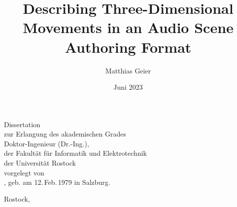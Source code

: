 \documentclass[
version=3.28,  %
a4paper,
11pt,
twoside,
openright,
cleardoublepage=empty,
BCOR=10mm,
DIV=12,
footinclude=false,
chapterprefix,
appendixprefix,
final,
]{scrbook}
\title{Describing Three-Dimensional Movements in an Audio Scene Authoring Format}
\author{Matthias Geier}
\date{Juni 2023}
\begin{document}
\makeatletter
\let\thetitle\@title
\let\theauthor\@author
\let\thedate\@date
\makeatother

\begin{titlepage}
  \begin{center}
    \vspace*{\fill}
    \textbf{\huge\thetitle}
    \vfill
    \normalsize


\begin{german}
Dissertation\\
zur Erlangung des akademischen Grades\\
Doktor-Ingenieur (Dr.-Ing.),\\
der Fakultät für Informatik und Elektrotechnik\\
der Universität Rostock\\
vorgelegt von\\
\theauthor, geb. am 12.\,Feb.\,1979 in Salzburg.
\end{german}
  \end{center}
    \vfill
\begin{german}
Rostock, \thedate
\end{german}
\end{titlepage}

\frontmatter

\cleardoubleoddpage
\vspace*{\fill}
\thispagestyle{empty}
{ \renewcommand*{\raggedsection}{\centering}

\addsec*{\abstractname}

\vfill
\begin{german}
\addsec*{\abstractname}

\end{german}
} %
\vfill
\cleardoubleoddpage

\tableofcontents

\mainmatter












\end{document}
